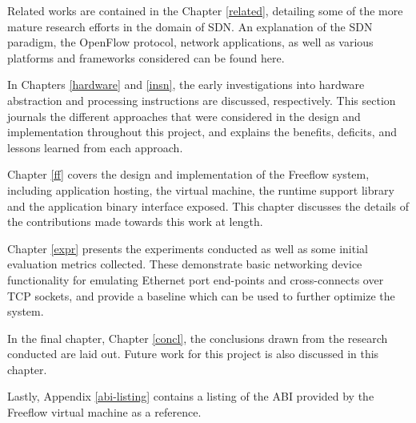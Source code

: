Related works are contained in the Chapter \ref{related}, detailing some of the
more mature research efforts in the domain of SDN. An explanation of the SDN
paradigm, the OpenFlow protocol, network applications, as well as various
platforms and frameworks considered can be found here.

In Chapters \ref{hardware} and \ref{insn}, the early investigations into
hardware abstraction and processing instructions are discussed,
respectively. This section journals the different approaches that were
considered in the design and implementation throughout this project, and
explains the benefits, deficits, and lessons learned from each approach.

Chapter \ref{ff} covers the design and implementation of the Freeflow system,
including application hosting, the virtual machine, the runtime support
library and the application binary interface exposed. This chapter discusses
the details of the contributions made towards this work at length.

Chapter \ref{expr} presents the experiments conducted as well as some initial
evaluation metrics collected. These demonstrate basic networking device
functionality for emulating Ethernet port end-points and cross-connects over
TCP sockets, and provide a baseline which can be used to further optimize the
system.

In the final chapter, Chapter \ref{concl}, the conclusions drawn from the
research conducted are laid out. Future work for this project is also discussed
in this chapter.

Lastly, Appendix \ref{abi-listing} contains a listing of the ABI provided by
the Freeflow virtual machine as a reference.
